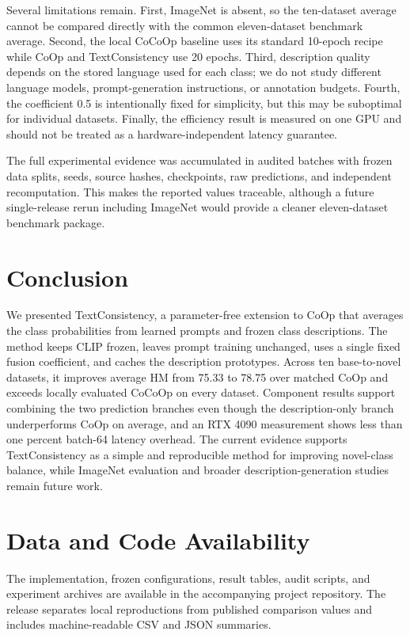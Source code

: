 \documentclass[preprint,12pt]{elsarticle}
\begin{document}
Several limitations remain. First, ImageNet is absent, so the ten-dataset average cannot be compared directly with the common eleven-dataset benchmark average. Second, the local CoCoOp baseline uses its standard 10-epoch recipe while CoOp and TextConsistency use 20 epochs. Third, description quality depends on the stored language used for each class; we do not study different language models, prompt-generation instructions, or annotation budgets. Fourth, the coefficient 0.5 is intentionally fixed for simplicity, but this may be suboptimal for individual datasets. Finally, the efficiency result is measured on one GPU and should not be treated as a hardware-independent latency guarantee.

The full experimental evidence was accumulated in audited batches with frozen data splits, seeds, source hashes, checkpoints, raw predictions, and independent recomputation. This makes the reported values traceable, although a future single-release rerun including ImageNet would provide a cleaner eleven-dataset benchmark package.

\section{Conclusion}

We presented TextConsistency, a parameter-free extension to CoOp that averages the class probabilities from learned prompts and frozen class descriptions. The method keeps CLIP frozen, leaves prompt training unchanged, uses a single fixed fusion coefficient, and caches the description prototypes. Across ten base-to-novel datasets, it improves average HM from 75.33 to 78.75 over matched CoOp and exceeds locally evaluated CoCoOp on every dataset. Component results support combining the two prediction branches even though the description-only branch underperforms CoOp on average, and an RTX 4090 measurement shows less than one percent batch-64 latency overhead. The current evidence supports TextConsistency as a simple and reproducible method for improving novel-class balance, while ImageNet evaluation and broader description-generation studies remain future work.

\section*{Data and Code Availability}

The implementation, frozen configurations, result tables, audit scripts, and experiment archives are available in the accompanying project repository. The release separates local reproductions from published comparison values and includes machine-readable CSV and JSON summaries.



\end{document}
